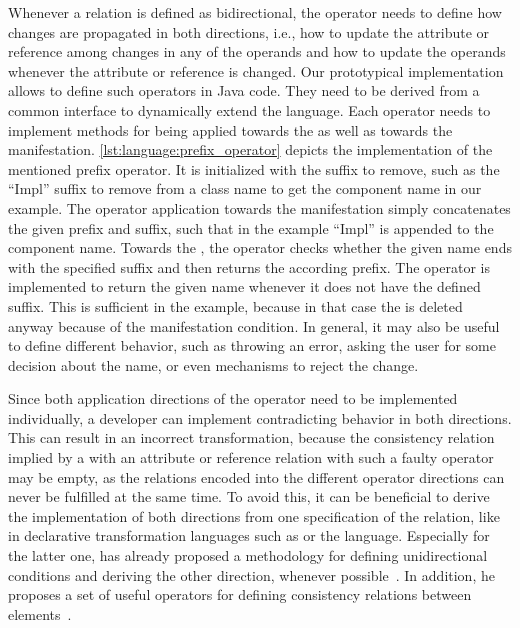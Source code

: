 Whenever a relation is defined as bidirectional, the operator needs to define how changes are propagated in both directions, i.e., how to update the \commonality attribute or reference among changes in any of the operands and how to update the operands whenever the \commonality attribute or reference is changed.
Our prototypical implementation allows to define such operators in Java code.
They need to be derived from a common interface to dynamically extend the language.
Each operator needs to implement methods for being applied towards the \commonality as well as towards the manifestation.
\autoref{lst:language:prefix_operator} depicts the implementation of the mentioned prefix operator.
It is initialized with the suffix to remove, such as the \enquote{Impl} suffix to remove from a class name to get the component name in our example.
The operator application towards the manifestation simply concatenates the given prefix and suffix, such that in the example \enquote{Impl} is appended to the component name.
Towards the \commonality, the operator checks whether the given name ends with the specified suffix and then returns the according prefix.
The operator is implemented to return the given name whenever it does not have the defined suffix.
This is sufficient in the example, because in that case the \commonality is deleted anyway because of the manifestation condition.
In general, it may also be useful to define different behavior, such as throwing an error, asking the user for some decision about the name, or even mechanisms to reject the change.

Since both application directions of the operator need to be implemented individually, a developer can implement contradicting behavior in both directions.
This can result in an incorrect transformation, because the consistency relation implied by a \commonality with an attribute or reference relation with such a faulty operator may be empty, as the relations encoded into the different operator directions can never be fulfilled at the same time.
To avoid this, it can be beneficial to derive the implementation of both directions from one specification of the relation, like in declarative transformation languages such as \qvtr or the \mappings language.
Especially for the latter one, \citeauthor{kramer2017a} has already proposed a methodology for defining unidirectional conditions and deriving the other direction, whenever possible~\cite[Sec. 7.4]{kramer2017a}.
In addition, he proposes a set of useful operators for defining consistency relations between elements~\cite[Sec. 7.3]{kramer2017a}.


